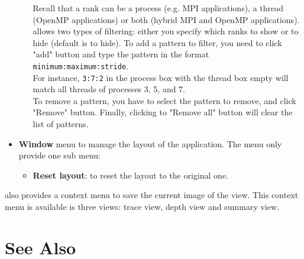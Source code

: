 \documentclass[english]{article}
\begin{document}
\begin{itemize}
\begin{itemize}
Recall that a rank can be a process (e.g. MPI applications), a thread (OpenMP applications) or both (hybrid MPI and OpenMP applications). 
 allows two types of filtering: either you specify which ranks {to show} or {to hide} (default is to hide). 
To add a pattern to filter, you need to click "add" button and type the pattern in the format \texttt{minimum:maximum:stride}. \\
For instance, \texttt{3:7:2} in the process box with the thread box empty will match all threads of processes 3, 5, and 7.\\
To remove a pattern, you have to select the pattern to remove, and click "Remove" button. Finally, clicking to "Remove all" button will clear the list of patterns.
 \end{itemize}
 \item \textbf{Window} menu to manage the layout of the application. The menu only provide one sub menu:
 \begin{itemize}
  \item \textbf{Reset layout}: to reset the layout to the original one.
 \end{itemize}
\end{itemize}

 also provides a context menu to save the current image of the view. 
This context menu is available is three views: trace view, depth view and summary view.






\section{See Also}
\end{document}

